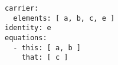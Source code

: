 \par\begin{minipage}{60ex}
\begin{verbatim}
carrier:
  elements: [ a, b, c, e ]
identity: e
equations:
  - this: [ a, b ]
    that: [ c ]


\end{verbatim}
\end{minipage}\par